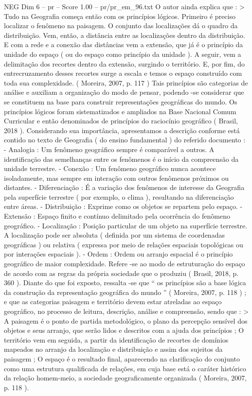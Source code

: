 \begin{textsample}{NEG Dim 6 – pr – Score 1.00 – pr/pr\_em\_96.txt}
O autor ainda explica que : > Tudo na Geografia começa então com os princípios lógicos.
Primeiro é preciso localizar o fenômeno na paisagem.
O conjunto das localizações dá o quadro da distribuição.
Vem, então, a distância entre as localizações dentro da distribuição.
E com a rede e a conexão das distâncias vem a extensão, que já é o princípio da unidade do espaço ( ou do espaço como princípio da unidade ).
A seguir, vem a delimitação dos recortes dentro da extensão, surgindo o território.
E, por fim, do entrecruzamento desses recortes surge a escala e temos o espaço construído com toda sua complexidade. ( Moreira, 2007, p. 117 ) Tais princípios são categorias de análise e auxiliam a organização do modo de pensar, podendo -se considerar que se constituem na base para construir representações geográficas do mundo.
Os princípios lógicos foram sistematizados e ampliados na Base Nacional Comum Curricular e então denominados de princípios do raciocínio geográfico ( Brasil, 2018 ).
Considerando sua importância, apresentamos a descrição conforme está contido no texto de Geografia ( do ensino fundamental ) do referido documento : - Analogia : Um fenômeno geográfico sempre é comparável a outros.
A identificação das semelhanças entre os fenômenos é o início da compreensão da unidade terrestre. - Conexão : Um fenômeno geográfico nunca acontece isoladamente, mas sempre em interação com outros fenômenos próximos ou distantes. - Diferenciação : É a variação dos fenômenos de interesse da Geografia pela superfície terrestre ( por exemplo, o clima ), resultando na diferenciação entre áreas. - Distribuição : Exprime como os objetos se repartem pelo espaço. - Extensão : Espaço finito e contínuo delimitado pela ocorrência do fenômeno geográfico. - Localização : Posição particular de um objeto na superfície terrestre.
A localização pode ser absoluta ( definida por um sistema de coordenadas geográficas ) ou relativa ( expressa por meio de relações espaciais topológicas ou por interações espaciais ). - Ordem : Ordem ou arranjo espacial é o princípio geográfico de maior complexidade.
Refere -se ao modo de estruturação do espaço de acordo com as regras da própria sociedade que o produziu ( Brasil, 2018, p. 360 ).
Diante do que foi exposto, ressalta -se que “ os princípios são a base lógica da construção da representação geográfica do mundo ” ( Moreira, 2007, p. 118 ) ; e que as categorias paisagem e território devem estar atreladas ao espaço geográfico, no processo de leitura, descrição, análise e compreensão, sendo que : > A paisagem é o ponto de partida metodológico, o plano da percepção sensível dos objetos e seus arranjo, que serão lidos e descritos com a ajuda dos princípios ; O território vem em seguida, a partir da identificação de recortes de domínios mapeados no arranjo da localização e distribuição e assim dos sujeitos da paisagem ; O espaço é o resultado final, aparecendo na clarificação do conjunto como uma estrutura qualificada de relações, em cuja base está o caráter histórico da relação homem-meio, a sociedade geograficamente organizada ( Moreira, 2007, p. 118 ).

\end{textsample}
